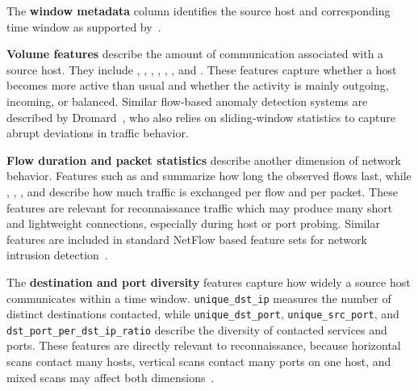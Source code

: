 The \textbf{window metadata} column identifies the source host and corresponding time window as supported by~\cite{dewaele_unsupervised_2010}.

\textbf{Volume features} describe the amount of communication associated with a source host. They include , , , , , , and . These features capture whether a host becomes more active than usual and whether the activity is mainly outgoing, incoming, or
balanced. Similar flow-based anomaly detection systems are described by Dromard~\cite{dromard_online_2017}, who also relies on sliding‑window statistics to capture abrupt deviations in traffic behavior.


\textbf{Flow duration and packet statistics} describe another dimension of network behavior. Features such as  and  summarize how long the observed flows last, while , , , and  describe how much traffic is exchanged per flow and per packet. These features are relevant for reconnaissance traffic which may produce many short and lightweight connections, especially during host or port probing. Similar features are included in standard NetFlow based feature sets for network intrusion detection~\cite{Sarhan_2021}.

The \textbf{destination and port diversity} features capture how widely a source host communicates within a time window. \texttt{unique\_dst\_ip} measures the number of distinct destinations contacted, while \texttt{unique\_dst\_port}, \texttt{unique\_src\_port}, and \texttt{dst\_port\_per\_dst\_ip\_ratio} describe the diversity of contacted services and ports. These features are directly relevant to reconnaissance, because horizontal scans contact many hosts, vertical scans contact many ports on one host, and mixed scans may affect both dimensions~\cite{ring_detection_2018}.

